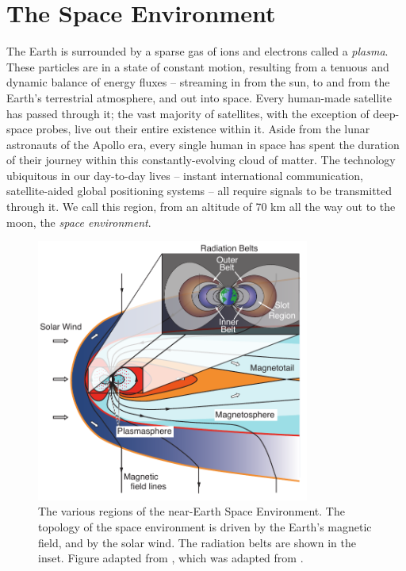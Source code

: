 \section{The Space Environment}
The Earth is surrounded by a sparse gas of ions and electrons called a \emph{plasma}. 
These particles are in a state of constant motion, resulting from a tenuous and dynamic balance of energy fluxes -- streaming in from the sun, to and from the Earth's terrestrial atmosphere, and out into space. Every human-made satellite has passed through it; the vast majority of satellites, with the exception of deep-space probes, live out their entire existence within it. Aside from the lunar astronauts of the Apollo era, every single human in space has spent the duration of their journey within this constantly-evolving cloud of matter. The technology ubiquitous in our day-to-day lives -- instant international communication, satellite-aided global positioning systems -- all require signals to be transmitted through it. We call this region, from an altitude of 70 km all the way out to the moon, the \emph{space environment}.


\begin{figure}[ht!]
\begin{center}
\includegraphics[width=0.8\textwidth]{figures/space_environment_figure.pdf}
\caption[Diagram of the various regions of the space environment]{The various regions of the near-Earth Space Environment. The topology of the space environment is driven by the Earth's magnetic field, and by the solar wind. The radiation belts are shown in the inset. Figure adapted from \cite{Graf2013}, which was adapted from \cite{Hill1991}.}
\label{fig:space_environment}
\end{center}
\end{figure}

